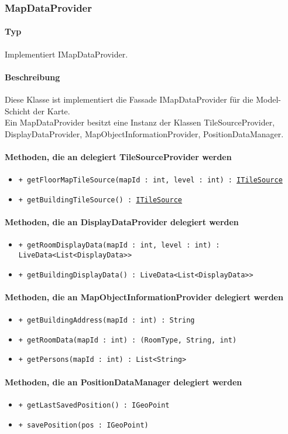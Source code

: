 \subsubsection{MapDataProvider}
\paragraph*{Typ}
Implementiert IMapDataProvider.
\paragraph*{Beschreibung}
Diese Klasse ist implementiert die Fassade IMapDataProvider für die Model-Schicht der Karte.\\
Ein MapDataProvider besitzt eine Instanz der Klassen 
TileSourceProvider, DisplayDataProvider, MapObjectInformationProvider, PositionDataManager.

\paragraph*{Methoden, die an delegiert TileSourceProvider werden}
\begin{itemize}
    \item \texttt{+ getFloorMapTileSource(mapId : int, level : int) : \href{https://osmdroid.github.io/osmdroid/javadocAll/org/osmdroid/tileprovider/tilesource/ITileSource.html}{ITileSource}}
    \item \texttt{+ getBuildingTileSource() : \href{https://osmdroid.github.io/osmdroid/javadocAll/org/osmdroid/tileprovider/tilesource/ITileSource.html}{ITileSource}}
\end{itemize}

\paragraph*{Methoden, die an DisplayDataProvider delegiert werden}
\begin{itemize}
    \item \texttt{+ getRoomDisplayData(mapId : int, level : int) : LiveData<List<DisplayData>>}
    \item \texttt{+ getBuildingDisplayData() : LiveData<List<DisplayData>>}
\end{itemize}

\paragraph*{Methoden, die an MapObjectInformationProvider delegiert werden}
\begin{itemize}
    \item \texttt{+ getBuildingAddress(mapId : int) : String}
    \item \texttt{+ getRoomData(mapId : int) : (RoomType, String, int)}
    \item \texttt{+ getPersons(mapId : int) : List<String>}
\end{itemize}

\paragraph*{Methoden, die an PositionDataManager delegiert werden}
\begin{itemize}
    \item \texttt{+ getLastSavedPosition() : IGeoPoint}
    \item \texttt{+ savePosition(pos : IGeoPoint)}
\end{itemize}
